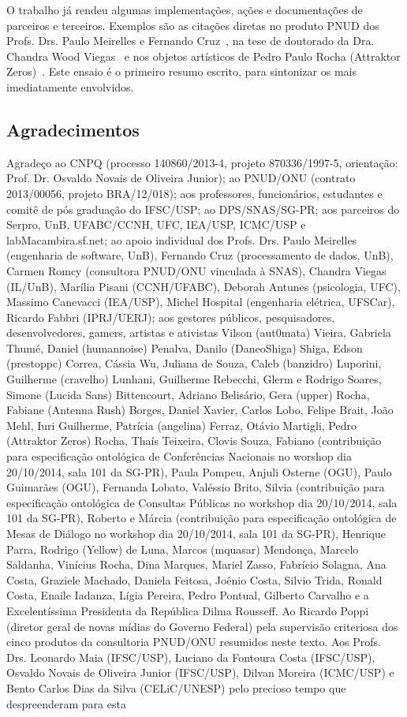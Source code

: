 \documentclass[a4paper, 11pt]{article} %
\begin{document}
O trabalho já rendeu algumas implementações, ações e documentações de parceiros e terceiros. Exemplos são as citações diretas no produto PNUD dos Profs. Drs. Paulo Meirelles e Fernando Cruz~\cite{paulo6}, na tese de doutorado da Dra. Chandra Wood Viegas~\cite{chandra} e nos objetos artísticos de Pedro Paulo Rocha (Attraktor Zeros)~\cite{pedro}. Este ensaio é o primeiro resumo escrito, para sintonizar os mais imediatamente envolvidos.

\subsection*{Agradecimentos}
Agradeço ao CNPQ (processo 140860/2013-4, projeto 870336/1997-5, orientação: Prof. Dr. Osvaldo Novais de Oliveira Junior); ao PNUD/ONU (contrato 2013/00056, projeto BRA/12/018); aos professores, funcionários, estudantes e comitê de pós graduação do IFSC/USP; ao DPS/SNAS/SG-PR; aos parceiros do Serpro, UnB, UFABC/CCNH, UFC, IEA/USP, ICMC/USP e labMacambira.sf.net; ao apoio individual dos Profs. Drs. Paulo Meirelles (engenharia de software, UnB), Fernando Cruz (processamento de dados, UnB), Carmen Romcy (consultora PNUD/ONU vinculada à SNAS), Chandra Viegas (IL/UnB), Marília Pisani (CCNH/UFABC), Deborah Antunes (psicologia, UFC), Massimo Canevacci (IEA/USP), Michel Hospital (engenharia elétrica, UFSCar), Ricardo Fabbri (IPRJ/UERJ); aos gestores públicos, pesquisadores, desenvolvedores, gamers, artistas e ativistas Vilson (aut0mata) Vieira, Gabriela Thumé, Daniel (humannoise) Penalva, Danilo (DaneoShiga) Shiga, Edson (prestoppc) Correa, Cássia Wu, Juliana de Souza, Caleb (banzidro) Luporini, Guilherme (cravelho) Lunhani, Guilherme Rebecchi, Glerm e Rodrigo Soares, Simone (Lucida Sans) Bittencourt, Adriano Belisário, Gera (upper) Rocha, Fabiane (Antenna Rush) Borges, Daniel Xavier, Carlos Lobo, Felipe Brait, João Mehl, Iuri Guilherme, Patrícia (angelina) Ferraz, Otávio Martigli, Pedro (Attraktor Zeros) Rocha, Thaís Teixeira, Clovis Souza, Fabiano (contribuição para especificação ontológica de Conferências Nacionais no worshop dia 20/10/2014, sala 101 da SG-PR), Paula Pompeu, Anjuli Osterne (OGU), Paulo Guimarães (OGU), Fernanda Lobato, Valéssio Brito, Silvia (contribuição para especificação ontológica de Consultas Públicas no workshop dia 20/10/2014, sala 101 da SG-PR), Roberto e Márcia (contribuição para especificação ontológica de Mesas de Diálogo no workshop dia 20/10/2014, sala 101 da SG-PR), Henrique Parra, Rodrigo (Yellow) de Luna, Marcos (mquasar) Mendonça, Marcelo Saldanha, Vinícius Rocha, Dina Marques, Mariel Zasso, Fabrício Solagna, Ana Costa, Graziele Machado, Daniela Feitosa, Joênio Costa, Silvio Trida, Ronald Costa, Enaile Iadanza, Lígia Pereira, Pedro Pontual, Gilberto Carvalho e a Excelentíssima Presidenta da República Dilma Rousseff. Ao Ricardo Poppi (diretor geral de novas mídias do Governo Federal) pela supervisão criteriosa dos cinco produtos da consultoria PNUD/ONU resumidos neste texto. Aos Profs. Drs. Leonardo Maia (IFSC/USP), Luciano da Fontoura Costa (IFSC/USP), Osvaldo Novais de Oliveira Junior (IFSC/USP), Dilvan Moreira (ICMC/USP) e Bento Carlos Dias da Silva (CELiC/UNESP) pelo precioso tempo que despreenderam para esta 
\end{document}
